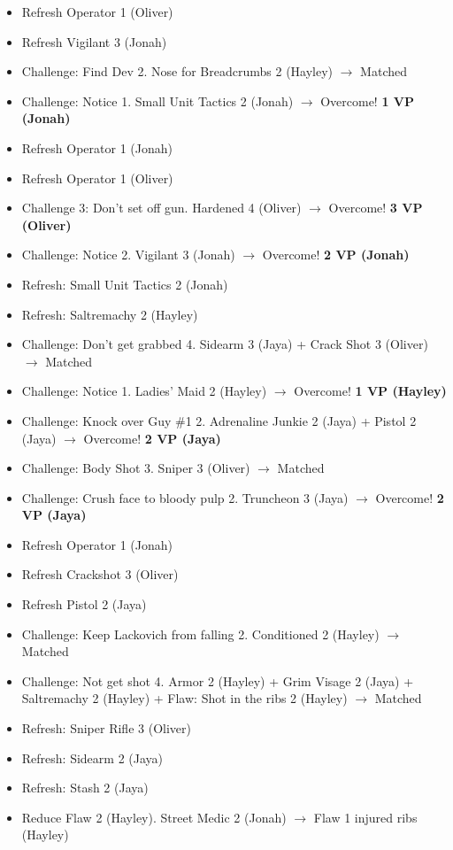 \begin{itemize}[noitemsep,topsep=0pt]
\item Refresh Operator 1 (Oliver)
\item Refresh Vigilant 3 (Jonah)
\item Challenge: Find Dev 2. Nose for Breadcrumbs 2 (Hayley) $\rightarrow$ Matched
\item Challenge: Notice 1.  Small Unit Tactics 2 (Jonah) $\rightarrow$ Overcome! \textbf{1 VP (Jonah)}
\item Refresh Operator 1 (Jonah)
\item Refresh Operator 1 (Oliver)
\item Challenge 3: Don't set off gun.  Hardened 4 (Oliver) $\rightarrow$ Overcome! \textbf{3 VP (Oliver)}
\item Challenge: Notice 2.  Vigilant 3 (Jonah)  $\rightarrow$ Overcome! \textbf{2 VP (Jonah)}
\item Refresh: Small Unit Tactics 2 (Jonah)
\item Refresh: Saltremachy 2 (Hayley)
\item Challenge: Don't get grabbed 4.  Sidearm 3 (Jaya) + Crack Shot 3 (Oliver) $\rightarrow$ Matched
\item Challenge: Notice 1.  Ladies' Maid 2 (Hayley) $\rightarrow$ Overcome! \textbf{1 VP (Hayley)}
\item Challenge: Knock over Guy \#1 2.  Adrenaline Junkie 2 (Jaya) + Pistol 2 (Jaya)  $\rightarrow$ Overcome! \textbf{2 VP (Jaya)}
\item Challenge: Body Shot 3.  Sniper 3 (Oliver) $\rightarrow$ Matched
\item Challenge: Crush face to bloody pulp 2.  Truncheon 3 (Jaya)  $\rightarrow$ Overcome! \textbf{2 VP (Jaya)}
\item Refresh Operator 1 (Jonah)
\item Refresh Crackshot 3 (Oliver)
\item Refresh Pistol 2 (Jaya)
\item Challenge: Keep Lackovich from falling 2.  Conditioned 2 (Hayley) $\rightarrow$ Matched
\item Challenge: Not get shot 4.  Armor 2 (Hayley) + Grim Visage 2 (Jaya) + Saltremachy 2 (Hayley) + Flaw: Shot in the ribs 2 (Hayley) $\rightarrow$ Matched
\item Refresh: Sniper Rifle 3 (Oliver)
\item Refresh: Sidearm 2 (Jaya)
\item Refresh: Stash 2 (Jaya)
\item Reduce Flaw 2 (Hayley).  Street Medic 2 (Jonah) $\rightarrow$  {\color[RGB]{255,0,0}Flaw 1 injured ribs (Hayley)} 

\end{itemize}
